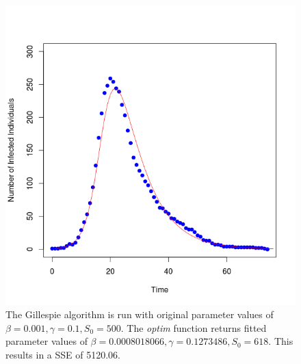 \documentclass[11pt, a4paper, oneside,titlepage]{article}
\begin{document}
\begin{centering}
\begin{figure}
\includegraphics[width=15cm]{simplefit.png}
\caption{The Gillespie algorithm is run with original parameter values of $\beta =
  0.001, \gamma = 0.1, S_0 = 500$. The \emph{optim} function returns
  fitted parameter values of $\beta = 0.0008018066, \gamma = 0.1273486, S_0
  = 618$. This results in a SSE of 5120.06.}
\end{figure}
\end{centering}
\end{document}
